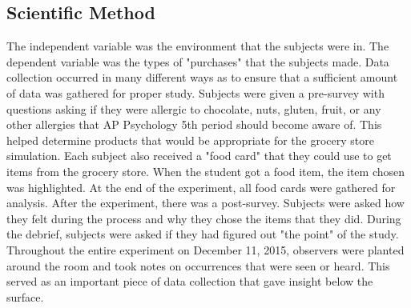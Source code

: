\documentclass[twoside]{article}
\begin{document}
\begin{multicols}{2}
\subsection{Scientific Method}
The independent variable was the environment that the subjects were in. The dependent variable was the types of "purchases" that the subjects made. Data collection occurred in many different ways as to ensure that a sufficient amount of data was gathered for proper study. Subjects were given a pre-survey with questions asking if they were allergic to chocolate, nuts, gluten, fruit, or any other allergies that AP Psychology 5th period should become aware of. This helped determine products that would be appropriate for the grocery store simulation. Each subject also received a "food card" that they could use to get items from the grocery store. When the student got a food item, the item chosen was highlighted. At the end of the experiment, all food cards were gathered for analysis. After the experiment, there was a post-survey. Subjects were asked how they felt during the process and why they chose the items that they did. During the debrief, subjects were asked if they had figured out "the point" of the study. Throughout the entire experiment on December 11, 2015, observers were planted around the room and took notes on occurrences that were seen or heard. This served as an important piece of data collection that gave insight below the surface.

\end{multicols}
\end{document}
